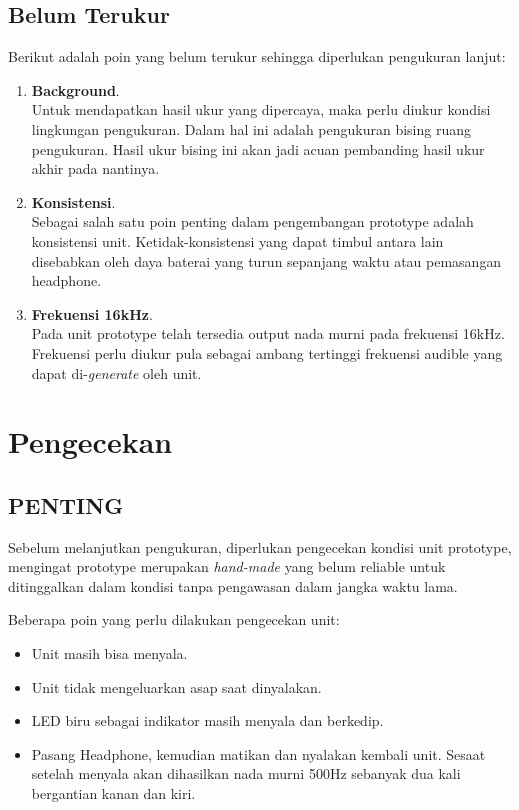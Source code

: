 \documentclass[12pt,]{article}
\begin{document}
	\newpage
	\subsection{Belum Terukur}
	
	Berikut adalah poin yang belum terukur sehingga diperlukan pengukuran lanjut:
	\begin{enumerate}
		\item \textbf{Background}.\\
		Untuk mendapatkan hasil ukur yang dipercaya, maka perlu diukur kondisi lingkungan pengukuran.
		Dalam hal ini adalah pengukuran bising ruang pengukuran.
		Hasil ukur bising ini akan jadi acuan pembanding hasil ukur akhir pada nantinya.
		
		\item \textbf{Konsistensi}.\\
		Sebagai salah satu poin penting dalam pengembangan prototype adalah konsistensi unit.
		Ketidak-konsistensi yang dapat timbul antara lain disebabkan oleh daya baterai yang turun sepanjang waktu
		atau pemasangan headphone.
		
		\item \textbf{Frekuensi 16kHz}.\\
		Pada unit prototype telah tersedia output nada murni pada frekuensi 16kHz.
		Frekuensi perlu diukur pula sebagai ambang tertinggi frekuensi audible yang dapat di-\textit{generate} oleh unit.
	\end{enumerate}

	\newpage
	\section{Pengecekan}
	
	\subsection{PENTING}
	
	Sebelum melanjutkan pengukuran, diperlukan pengecekan kondisi unit prototype,
	mengingat prototype merupakan \textit{hand-made} yang belum reliable untuk ditinggalkan dalam
	kondisi tanpa pengawasan dalam jangka waktu lama.
	
	Beberapa poin yang perlu dilakukan pengecekan unit:
	\begin{itemize}
		\item Unit masih bisa menyala.
		\item Unit tidak mengeluarkan asap saat dinyalakan.
		\item LED biru sebagai indikator masih menyala dan berkedip.
		\item Pasang Headphone, kemudian matikan dan nyalakan kembali unit. Sesaat setelah menyala
		akan dihasilkan nada murni 500Hz sebanyak dua kali bergantian kanan dan kiri.
	\end{itemize}
	
\end{document}
